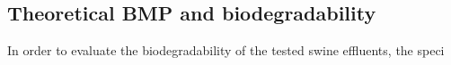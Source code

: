 \subsection{Theoretical BMP and biodegradability}
In order to evaluate the biodegradability of the tested swine effluents, the speci
